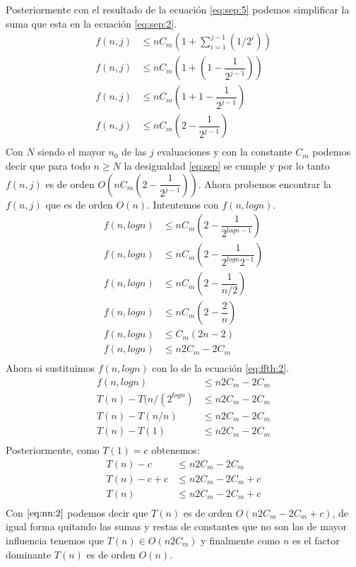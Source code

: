 \documentclass[12pt]{article}
\begin{document}
Posteriormente con el resultado de la ecuación \ref{eq:sep:5} podemos simplificar la suma que esta en la ecuación \ref{eq:sep:2}.
\begin{equation}\label{eq:sep:6}
\begin{split}
f(n,j) & \leq nC_m (1 + \sum_{i=1}^{j-1}{(1/2^{i})}) \\
f(n,j) & \leq nC_m (1 + (1 - \dfrac{1}{2^{j-1}} )) \\
f(n,j) & \leq nC_m (1 + 1 - \dfrac{1}{2^{j-1}} ) \\
f(n,j) & \leq nC_m (2 - \dfrac{1}{2^{j-1}} ) \\
\end{split}
\end{equation}
Con $N$ siendo el mayor $n_0$ de las $j$ evaluaciones y con la constante $C_m$ podemos decir que para todo $n\geq N$ la desigualdad \eqref{eq:sep} se cumple y por lo tanto $f(n,j)$ es de orden $O(nC_m (2 - \dfrac{1}{2^{j-1}} ))$.
Ahora probemos encontrar la $f(n,j)$ que es de orden $O(n)$. Intentemos con $f(n,logn)$.
\begin{equation}\label{eq:oct:2}
\begin{split}
f(n,logn) & \leq nC_m (2 - \dfrac{1}{2^{logn-1}} ) \\
f(n,logn) &  \leq nC_m (2 - \dfrac{1}{2^{logn} 2^{-1}} ) \\
f(n,logn) & \leq nC_m (2 - \dfrac{1}{n/2} ) \\
f(n,logn) & \leq nC_m (2 - \dfrac{2}{n} ) \\
f(n,logn) & \leq C_m (2n - 2) \\
f(n,logn) & \leq n2C_m - 2C_m \\
\end{split}
\end{equation}
Ahora si sustituimos $f(n,logn)$ con lo de la ecuación \ref{eq:ffth:2}.
\begin{equation}\label{eq:oct:3}
\begin{split}
f(n,logn)  & \leq n2C_m - 2C_m \\
T(n)-T(n/(2^{logn}) & \leq n2C_m - 2C_m \\
T(n)-T(n/n)  & \leq n2C_m - 2C_m \\
T(n)-T(1) & \leq n2C_m - 2C_m \\
\end{split}
\end{equation}
Posteriormente, como $T(1)=c$ obtenemos:
\begin{equation}\label{eq:nn:2}
\begin{split}
T(n)-c  & \leq n2C_m - 2C_m \\
T(n)-c+c & \leq n2C_m - 2C_m + c\\
T(n) & \leq n2C_m - 2C_m + c\\
\end{split}
\end{equation}
Con $\eqref{eq:nn:2}$ podemos decir que $T(n)$ es de orden $O(n2C_m - 2C_m + c)$, de igual forma quitando las sumas y restas de constantes que no son las de mayor influencia tenemos que $T(n) \in O(n2C_m)$ y finalmente como $n$ es el factor dominante $T(n)$ es de orden $O(n)$.\\
\end{document}
